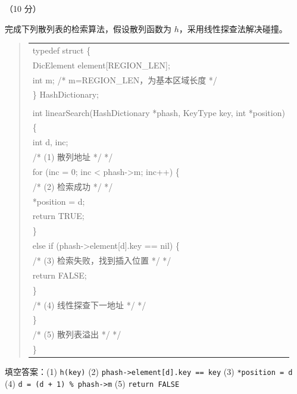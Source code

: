 \begin{question}[散列表检索]（10 分）

完成下列散列表的检索算法，假设散列函数为 $h$，采用线性探查法解决碰撞。

\begin{quote}
\footnotesize
\begin{tabular}{@{}l@{}}
typedef struct \{\\
    DicElement element[REGION\_LEN];\\
    int m;  /* m=REGION\_LEN，为基本区域长度 */\\
\} HashDictionary;\\
\\
int linearSearch(HashDictionary *phash, KeyType key, int *position)\\
\{\\
    int d, inc;\\
\underline{\hspace{12em}} /* (1) 散列地址 */ */\\
    for (inc = 0; inc < phash->m; inc++) \{\\
\underline{\hspace{12em}} /* (2) 检索成功 */ */\\
            *position = d;\\
            return TRUE;\\
        \}\\
        else if (phash->element[d].key == nil) \{\\
\underline{\hspace{12em}} /* (3) 检索失败，找到插入位置 */ */\\
            return FALSE;\\
        \}\\
\underline{\hspace{12em}} /* (4) 线性探查下一地址 */ */\\
    \}\\
\underline{\hspace{12em}} /* (5) 散列表溢出 */ */\\
\}\\
\end{tabular}
\end{quote}

\begin{solution}
填空答案：(1) \texttt{h(key)} (2) \texttt{phash->element[d].key == key} (3) \texttt{*position = d} (4) \texttt{d = (d + 1) \% phash->m} (5) \texttt{return FALSE}
\end{solution}
\end{question}

